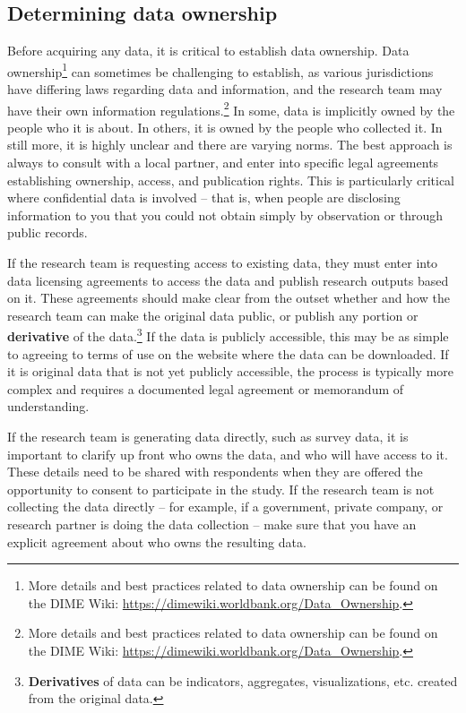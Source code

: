 \documentclass[
]{book}
\begin{document}
\hypertarget{determining-data-ownership}{%
\subsection*{Determining data ownership}\label{determining-data-ownership}}

Before acquiring any data, it is critical to establish data ownership.
Data ownership\footnote{More details and best practices related to data ownership
  can be found on the DIME Wiki: \url{https://dimewiki.worldbank.org/Data_Ownership}.}
can sometimes be challenging to establish,
as various jurisdictions have differing laws regarding data and information,
and the research team may have their own information regulations.\footnote{More details and best practices related to data ownership
  can be found on the DIME Wiki:
  \url{https://dimewiki.worldbank.org/Data_Ownership}.}
In some, data is implicitly owned by the people who it is about.
In others, it is owned by the people who collected it.
In still more, it is highly unclear and there are varying norms.
The best approach is always to consult with a local partner,
and enter into specific legal agreements establishing ownership,
access, and publication rights.
This is particularly critical where confidential data is involved
-- that is, when people are disclosing information to you
that you could not obtain simply by observation or through public records.

If the research team is requesting access to existing data,
they must enter into data licensing agreements
to access the data and publish research outputs based on it.
These agreements should make clear from the outset whether and how the
research team can make the original data public, or publish any portion or \textbf{derivative} of the data.\footnote{\textbf{Derivatives} of data can be indicators, aggregates,
  visualizations, etc. created from the original data.}
If the data is publicly accessible,
this may be as simple to agreeing to terms of use on the website where the data can be downloaded.
If it is original data that is not yet publicly accessible,
the process is typically more complex and requires a documented legal agreement or memorandum of understanding.

If the research team is generating data directly, such as survey data,
it is important to clarify up front who owns the data,
and who will have access to it.
These details need to be shared with respondents when they are offered the opportunity
to consent to participate in the study.
If the research team is not collecting the data directly --
for example, if a government, private company, or research partner is doing the data collection --
make sure that you have an explicit agreement
about who owns the resulting data.
\end{document}
